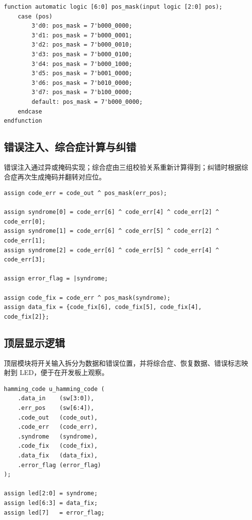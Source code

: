 ﻿\documentclass[UTF8,a4paper,12pt]{ctexart}
\begin{document}
\begin{lstlisting}[style=svstyle,caption={错误位置到掩码的转换函数}]
function automatic logic [6:0] pos_mask(input logic [2:0] pos);
    case (pos)
        3'd0: pos_mask = 7'b000_0000;
        3'd1: pos_mask = 7'b000_0001;
        3'd2: pos_mask = 7'b000_0010;
        3'd3: pos_mask = 7'b000_0100;
        3'd4: pos_mask = 7'b000_1000;
        3'd5: pos_mask = 7'b001_0000;
        3'd6: pos_mask = 7'b010_0000;
        3'd7: pos_mask = 7'b100_0000;
        default: pos_mask = 7'b000_0000;
    endcase
endfunction
\end{lstlisting}

\subsection{错误注入、综合症计算与纠错}

错误注入通过异或掩码实现；综合症由三组校验关系重新计算得到；纠错时根据综合症再次生成掩码并翻转对应位。

\begin{lstlisting}[style=svstyle,caption={错误注入、综合症和纠错逻辑}]
assign code_err = code_out ^ pos_mask(err_pos);

assign syndrome[0] = code_err[6] ^ code_err[4] ^ code_err[2] ^ code_err[0];
assign syndrome[1] = code_err[6] ^ code_err[5] ^ code_err[2] ^ code_err[1];
assign syndrome[2] = code_err[6] ^ code_err[5] ^ code_err[4] ^ code_err[3];

assign error_flag = |syndrome;

assign code_fix = code_err ^ pos_mask(syndrome);
assign data_fix = {code_fix[6], code_fix[5], code_fix[4], code_fix[2]};
\end{lstlisting}

\subsection{顶层显示逻辑}

顶层模块将开关输入拆分为数据和错误位置，并将综合症、恢复数据、错误标志映射到 LED，便于在开发板上观察。

\begin{lstlisting}[style=svstyle,caption={顶层模块 LED 显示逻辑}]
hamming_code u_hamming_code (
    .data_in    (sw[3:0]),
    .err_pos    (sw[6:4]),
    .code_out   (code_out),
    .code_err   (code_err),
    .syndrome   (syndrome),
    .code_fix   (code_fix),
    .data_fix   (data_fix),
    .error_flag (error_flag)
);

assign led[2:0] = syndrome;
assign led[6:3] = data_fix;
assign led[7]   = error_flag;
\end{lstlisting}
\end{document}

